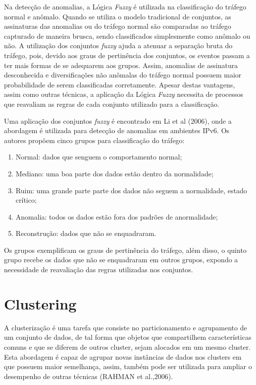 \documentclass[12pt,openright,oneside,a4paper,english,spanish,brazil]{unifil}
\begin{document}
\indent Na detecção de anomalias, a Lógica\textit{ Fuzzy} é utilizada na classificação do tráfego normal e anômalo. Quando se utiliza o modelo tradicional de conjuntos, as assinaturas das anomalias ou do tráfego normal são comparadas ao tráfego capturado de maneira brusca, sendo classificados simplesmente como anômalo ou não. A utilização dos conjuntos \textit{fuzzy} ajuda a atenuar a separação bruta do tráfego, pois, devido aos graus de pertinência dos conjuntos, os eventos passam a ter mais formas de se adequarem aos grupos. Assim, anomalias de assinatura desconhecida e diversificações não anômalas do tráfego normal possuem maior probabilidade de serem classificadas corretamente. Apesar destas vantagens, assim como outras técnicas, a aplicação da Lógica \textit{Fuzzy} necessita de processos que reavaliam as regras de cada conjunto utilizado para a classificação.

\indent Uma aplicação dos conjuntos \textit{fuzzy} é encontrado em Li et al (2006), onde a abordagem é utilizada  para detecção de anomalias em ambientes IPv6. Os autores propõem cinco grupos para classificação do tráfego:
\begin{enumerate}
  \item Normal: dados que senguem o comportamento normal;
  \item Mediano: uma boa parte dos dados estão dentro da normalidade;
  \item Ruim: uma grande parte parte dos dados não seguem a normalidade, estado crítico;
  \item Anomalia: todos os dados estão fora dos padrões de anormalidade;
  \item Reconstrução: dados que não se enquadraram.
\end{enumerate}

\indent Os grupos exemplificam os graus de pertinência do tráfego, além disso, o quinto grupo recebe os dados que não se enquadraram em outros grupos, expondo a necessidade de reavaliação das regras utilizadas nos conjuntos.
  
  \section{Clustering}
\indent A clusterização é uma tarefa que consiste no particionamento e agrupamento de um conjunto de dados, de tal forma que objetos que compartilhem características comuns e que se diferem de outros cluster, sejam alocados em um mesmo cluster. Esta abordagem é capaz de agrupar novas instâncias de dados nos clusters em que possuem maior semelhança, assim, também pode ser utilizada para ampliar o desempenho de outras técnicas (RAHMAN et al.,2006).
\end{document}
